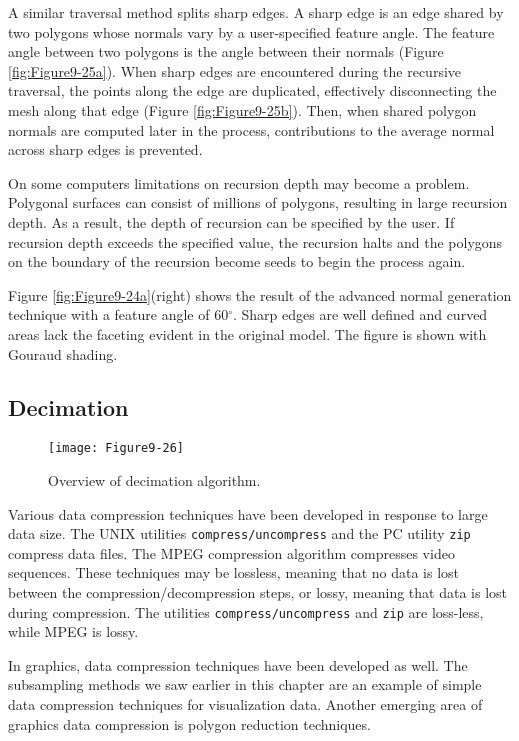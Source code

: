 A similar traversal method splits sharp edges. A sharp edge is an edge shared by two polygons whose normals vary by a user-specified feature angle. The feature angle between two polygons is the angle between their normals (Figure \ref{fig:Figure9-25a}). When sharp edges are encountered during the recursive traversal, the points along the edge are duplicated, effectively disconnecting the mesh along that edge (Figure \ref{fig:Figure9-25b}). Then, when shared polygon normals are computed later in the process, contributions to the average normal across sharp edges is prevented.

On some computers limitations on recursion depth may become a problem. Polygonal surfaces can consist of millions of polygons, resulting in large recursion depth. As a result, the depth of recursion can be specified by the user. If recursion depth exceeds the specified value, the recursion halts and the polygons on the boundary of the recursion become seeds to begin the process again.

Figure \ref{fig:Figure9-24a}(right) shows the result of the advanced normal generation technique with a feature angle of 60$^\circ$. Sharp edges are well defined and curved areas lack the faceting evident in the original model. The figure is shown with Gouraud shading.

\subsection{Decimation}

\begin{figure}[!htb]
	\centering
	\texttt{[image: Figure9-26]}
	\caption{Overview of decimation algorithm.}
	\label{fig:Figure9-26}
\end{figure}

Various data compression techniques have been developed in response to large data size. The UNIX utilities \texttt{compress/uncompress} and the PC utility \texttt{zip} compress data files. The MPEG compression algorithm compresses video sequences. These techniques may be lossless, meaning that no data is lost between the compression/decompression steps, or lossy, meaning that data is lost during compression. The utilities \texttt{compress/uncompress} and \texttt{zip} are loss-less, while MPEG is lossy.

In graphics, data compression techniques have been developed as well. The subsampling methods we saw earlier in this chapter are an example of simple data compression techniques for visualization data. Another emerging area of graphics data compression is polygon reduction techniques.

